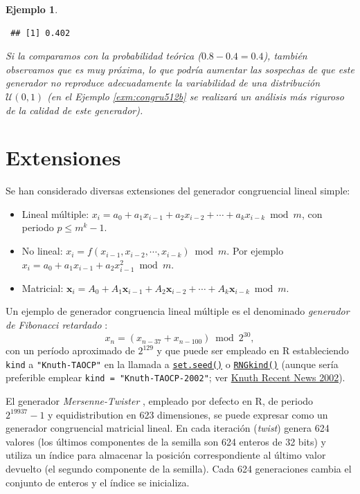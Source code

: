 \documentclass[
  spanish,
  10pt,
]{book}
\renewcommand{\mathbf}[1]{\symbf{#1}}
\theoremstyle{break}
\newtheorem{example}{Ejemplo}[chapter]
\theoremstyle{nonumberplain}
\begin{document}
\begin{example}
\begin{verbatim}
 ## [1] 0.402
\end{verbatim}

Si la comparamos con la probabilidad teórica (\(0.8 - 0.4 = 0.4\)), también observamos que es muy próxima, lo que podría aumentar las sospechas de que este generador no reproduce adecuadamente la variabilidad de una distribución \(\mathcal{U}(0,1)\) (en el Ejemplo \ref{exm:congru512b} se realizará un análisis más riguroso de la calidad de este generador).
\end{example}

\section{Extensiones}\label{ext-cong}

Se han considerado diversas extensiones del generador congruencial lineal simple:

\begin{itemize}
\item
  Lineal múltiple:
  \(x_{i}= a_0 + a_1 x_{i-1} + a_2 x_{i-2} + \cdots + a_{k} x_{i-k} \bmod m\),
  con periodo \(p\leq m^{k}-1\).
\item
  No lineal:
  \(x_{i} = f\left(  x_{i-1}, x_{i-2}, \cdots, x_{i-k} \right) \bmod m\).
  Por ejemplo \(x_{i} = a_0 + a_1 x_{i-1} + a_2 x_{i-1}^2 \bmod m\).
\item
  Matricial:
  \(\mathbf{x}_{i} = A_0 + A_1 \mathbf{x}_{i-1}
  + A_2 \mathbf{x}_{i-2} + \cdots
  + A_{k} \mathbf{x}_{i-k} \bmod m\).
\end{itemize}

Un ejemplo de generador congruencia lineal múltiple es el denominado \emph{generador de Fibonacci retardado} \citep{knuth1969}:
\[x_n = (x_{n-37} + x_{n-100}) \bmod 2^{30},\]
con un período aproximado de \(2^{129}\) y que puede ser empleado en R estableciendo \texttt{kind} a \texttt{"Knuth-TAOCP"} en la llamada a \href{https://rdrr.io/r/base/Random.html}{\texttt{set.seed()}} o \href{https://rdrr.io/r/base/Random.html}{\texttt{RNGkind()}} (aunque sería preferible emplear \texttt{kind\ =\ "Knuth-TAOCP-2002"}; ver \href{https://www-cs-faculty.stanford.edu/~knuth/news02.html\#rng}{Knuth Recent News 2002}).

El generador \emph{Mersenne-Twister} \citep{matsumoto1998}, empleado por defecto en R, de periodo \(2^{19937}-1\) y equidistribution en 623 dimensiones, se puede expresar como un generador congruencial matricial lineal.
En cada iteración (\emph{twist}) genera 624 valores (los últimos componentes de la semilla son 624 enteros de 32 bits) y utiliza un índice para almacenar la posición correspondiente al último valor devuelto (el segundo componente de la semilla).
Cada 624 generaciones cambia el conjunto de enteros y el índice se inicializa.
\end{document}
